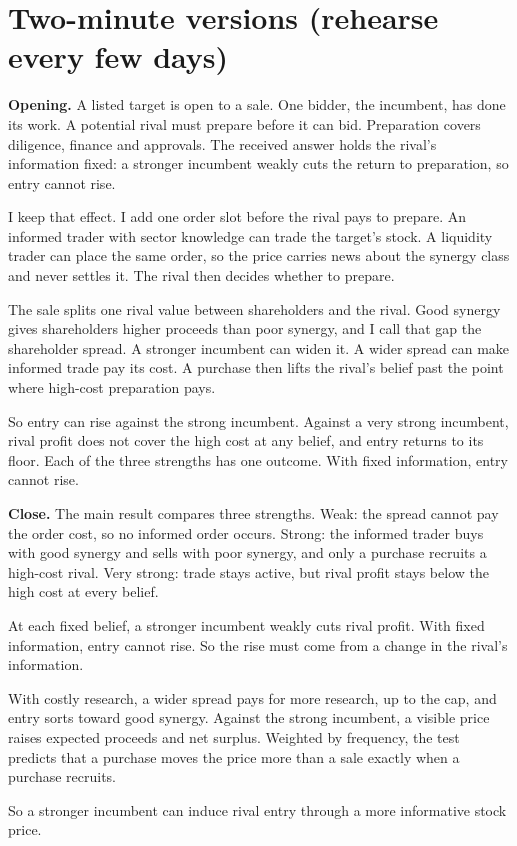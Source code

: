 \documentclass[10.5pt]{article}
\begin{document}
\section*{Two-minute versions (rehearse every few days)}
\textbf{Opening.} A listed target is open to a sale. One bidder, the incumbent, has done its work. A potential rival must prepare before it can bid. Preparation covers diligence, finance and approvals. The received answer holds the rival's information fixed: a stronger incumbent weakly cuts the return to preparation, so entry cannot rise.

I keep that effect. I add one order slot before the rival pays to prepare. An informed trader with sector knowledge can trade the target's stock. A liquidity trader can place the same order, so the price carries news about the synergy class and never settles it. The rival then decides whether to prepare.

The sale splits one rival value between shareholders and the rival. Good synergy gives shareholders higher proceeds than poor synergy, and I call that gap the shareholder spread. A stronger incumbent can widen it. A wider spread can make informed trade pay its cost. A purchase then lifts the rival's belief past the point where high-cost preparation pays.

So entry can rise against the strong incumbent. Against a very strong incumbent, rival profit does not cover the high cost at any belief, and entry returns to its floor. Each of the three strengths has one outcome. With fixed information, entry cannot rise.

\textbf{Close.} The main result compares three strengths. Weak: the spread cannot pay the order cost, so no informed order occurs. Strong: the informed trader buys with good synergy and sells with poor synergy, and only a purchase recruits a high-cost rival. Very strong: trade stays active, but rival profit stays below the high cost at every belief.

At each fixed belief, a stronger incumbent weakly cuts rival profit. With fixed information, entry cannot rise. So the rise must come from a change in the rival's information.

With costly research, a wider spread pays for more research, up to the cap, and entry sorts toward good synergy. Against the strong incumbent, a visible price raises expected proceeds and net surplus. Weighted by frequency, the test predicts that a purchase moves the price more than a sale exactly when a purchase recruits.

So a stronger incumbent can induce rival entry through a more informative stock price.
\end{document}
